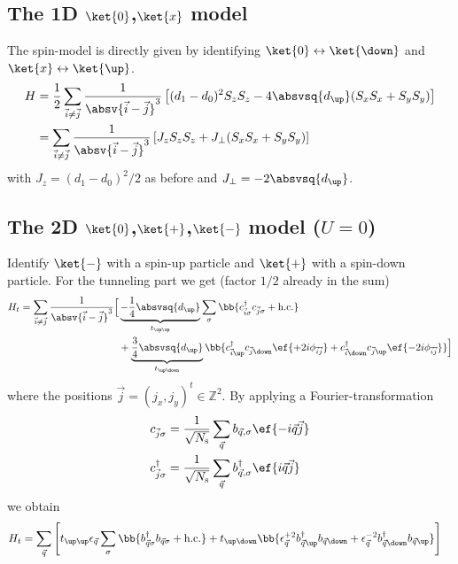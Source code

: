 \subsection{The 1D $\ket{0}$,$\ket{x}$ model}
The spin-model is directly given by identifying $\ket{0} \leftrightarrow \ket{\down}$ and $\ket{x} \leftrightarrow \ket{\up}$.
\begin{align*}
H&=\frac{1}{2}\sum_{\vec{i}\ne \vec{j}} \frac{1}{\absv{\vec{i}-\vec{j}}^3}\left[ (d_1-d_0)^2 S_z S_z - 4\absvsq{d_{\up}} (S_x S_x + S_y S_y) \right]\\
&= \sum_{\vec{i}\ne \vec{j}} \frac{1}{\absv{\vec{i}-\vec{j}}^3}\left[ J_z S_z S_z + J_\perp (S_x S_x + S_y S_y) \right]
\end{align*}
with $J_z=(d_1-d_0)^2/2$ as before and $J_\perp = - 2\absvsq{d_\up}$.

\subsection{The 2D $\ket{0}$,$\ket{+}$,$\ket{-}$ model ($U=0$)}
Identify $\ket{-}$ with a spin-up particle and $\ket{+}$ with a spin-down particle.
For the tunneling part we get (factor $1/2$ already in the sum)
\begin{align*}
H_t=\sum_{\vec{i}\ne \vec{j}}\frac{1}{\absv{\vec{i}-\vec{j}}^3} \Big[ &\underbrace{-\frac{1}{4}\absvsq{d_\up}}_{t_{\up\up}} \sum_\sigma \bb{c^\dagger_{\vec{i}\sigma} c_{\vec{j}\sigma} + \text{h.c.}}\\
&+ \underbrace{\frac{3}{4}\absvsq{d_\up}}_{t_{\up\down}} \bb{c^\dagger_{\vec{i}\up}  c_{\vec{j}\down} \ef{+2i\phi_{\vec{i}\vec{j}}} + c^\dagger_{\vec{i}\down}  c_{\vec{j}\up} \ef{-2i\phi_{\vec{i}\vec{j}}} }\Big]
\end{align*}
where the positions $\vec{j}=(j_x,j_y)^t\in \mathbb{Z}^2$.
By applying a Fourier-transformation
\begin{align*}
c_{\vec{j}\sigma}&=\frac{1}{\sqrt{N_\text{s}}}\sum_{\vec{q}}b_{\vec{q},\sigma} \ef{-i\vec{q}\vec{j}}\\
c^\dagger_{\vec{j}\sigma}&=\frac{1}{\sqrt{N_\text{s}}}\sum_{\vec{q}}b^\dagger_{\vec{q},\sigma} \ef{i\vec{q}\vec{j}}
\end{align*}
we obtain
\begin{align*}
H_t&=\sum_{\vec{q}}  \left[t_{\up\up} \epsilon_{\vec{q}}\sum_\sigma \bb{b^\dagger_{\vec{q}\sigma} b_{\vec{q}\sigma} + \text{h.c.}} + t_{\up\down} \bb{ \epsilon_{\vec{q}}^{+2} b^\dagger_{\vec{q}\up}  b_{\vec{q}\down}  + \epsilon_{\vec{q}}^{-2} b^\dagger_{\vec{q}\down}  b_{\vec{q}\up}  }\right]
\end{align*}
